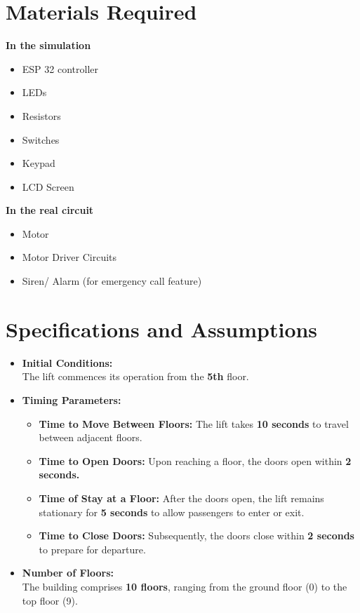 \documentclass{article}
\begin{document}
\pagebreak
 
\section{Materials Required}
\textbf{In the simulation}
\\
\begin{itemize}
\item \gls{ESP 32} controller
\item LEDs
\item Resistors
\item Switches
\item Keypad
\item \gls{LCD} Screen
\end{itemize}
\textbf{In the real circuit}
\\
\begin{itemize}
\item Motor
\item\gls{Motor Driver Circuits}
\item Siren/ Alarm (for emergency call feature)
\end{itemize}
\section{Specifications and Assumptions}
\begin{itemize}
\item
{ \textbf{Initial Conditions:}}\\
The lift commences its operation from the \textbf{5th} floor.\\
\item
{ \textbf{Timing Parameters:}}\\
\begin{itemize}
\item
\textbf{Time to Move Between Floors:} The lift takes \textbf{10 seconds} to travel between adjacent floors.
\item
\textbf{Time to Open Doors:} Upon reaching a floor, the doors open within \textbf{2 seconds.}
\item
\textbf{Time of Stay at a Floor:} After the doors open, the lift remains stationary for \textbf{5 seconds} to allow passengers to enter or exit.
\item
\textbf{Time to Close Doors:} Subsequently, the doors close within \textbf{2 seconds} to prepare for departure.
\end{itemize}
\item
{\textbf{Number of Floors:}}\\
The building comprises \textbf{10 floors}, ranging from the ground floor (0) to the top floor (9).
\end{itemize}
\clearpage
\end{document}
